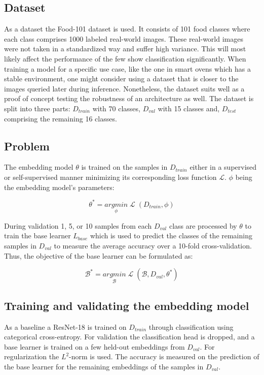 \subsection{Dataset}
As a dataset the Food-101 dataset \cite{fleet_food-101_2014} is used. It consists of 101 food classes where 
each class comprises 1000 labeled real-world images. These real-world images were not taken in a standardized 
way and suffer high variance. This will most likely affect the performance of the few show classification 
significantly. When training a model for a specific use case, like the one in smart ovens which has a stable environment, one 
might consider using a dataset that is closer to the images queried later during inference. 
Nonetheless, the dataset suits well as a proof of concept testing the robustness of an architecture as well.
The dataset is split into three parts: $D_{train}$ with 70 classes,
$D_{val}$ with 15 classes and, $D_{test}$ comprising the remaining 16 classes.

\subsection{Problem}
The embedding model $\theta$ is trained on the samples in $D_{train}$ either in a supervised or self-supervised manner
minimizing its corresponding loss function $\mathcal{L}$. $\phi$ being the embedding model's parameters:

\begin{equation}
	\theta^*= \underset{\phi}{argmin}\;{\mathcal{L}\;(D_{train}, \phi)}
\end{equation}

During validation 1, 5, or 10 samples from each $D_{val}$ class are processed by $\theta$ to train the 
base learner $L_{base}$ which is used to predict the classes of the remaining samples in $D_{val}$ 
to measure the average accuracy over a 10-fold cross-validation. 
Thus, the objective of the base learner can be formulated as:

\begin{equation}
	\mathcal{B}^* = \underset{\mathcal{B}}{argmin}\;{\mathcal{L}\;(\mathcal{B}, D_{val}, \theta^*)}
\end{equation}

\subsection{Training and validating the embedding model}
As a baseline a ResNet-18 is trained on $D_{train}$ through classification using 
categorical cross-entropy. For validation the classification 
head is dropped, and a base learner is trained on a few held-out embeddings from $D_{val}$. 
For regularization the $L^2$-norm is used. The accuracy is 
measured on the prediction of the base learner for the remaining embeddings of the samples in $D_{val}$.

